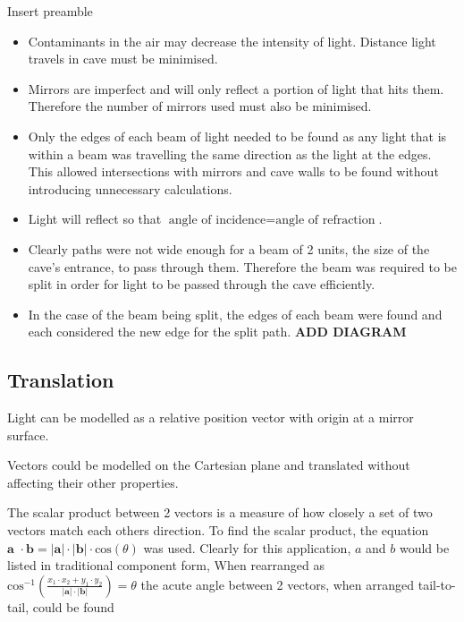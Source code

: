 \documentclass[11pt, letterpaper]{article}
\begin{document}
	Insert preamble 
	\begin{itemize}
		
		
		
		
		\item Contaminants in the air may decrease the intensity of light. Distance light travels in cave must be minimised.
		
		\item Mirrors are imperfect and will only reflect a portion of light that hits them.  Therefore the number of mirrors used must also be minimised.
		
		\item Only the edges of each beam of light needed to be found as any light that is within a beam was travelling the same direction as the light at the edges. This allowed intersections with mirrors and cave walls to be found without introducing unnecessary calculations.
		
		\item Light will reflect so that $\textrm{angle  of incidence} = \textrm{angle of refraction}$.
		
		
		\item Clearly paths were not wide enough for a beam of 2 units, the size of the cave's entrance, to pass through them. Therefore the beam was required to be split in order for light to be passed through the cave efficiently.
		
		\item In the case of the beam being split, the edges of each beam were found and each considered the new edge for the split path.
		\newline
		\textbf{ADD DIAGRAM}
	\end{itemize}
	
	
	
	
	
	\subsection{Translation}
	\par 
	
	
		
Light can be modelled as a relative position vector with origin at a mirror surface.
		
Vectors could be modelled on the Cartesian plane and translated without affecting their other properties. 
		
		
		 The scalar product between 2 vectors is a measure of how closely a set of two vectors match each others direction. To find the scalar product, the equation $\textbf{a }\cdot \textbf{b}=|\textbf{a}|\cdot|\textbf{b}| \cdot \textrm{cos}(\theta)$ was used. Clearly for this application, $a$ and $b$ would be listed in traditional component form, When rearranged as $\textrm{cos}^{-1}{(\frac{x_1 \cdot x_2 + y_1 \cdot y_2}{|\textbf{a}|\cdot|\textbf{b}|})} = \theta$ the acute angle between 2 vectors, when arranged tail-to-tail, could be found
		
\end{document}
